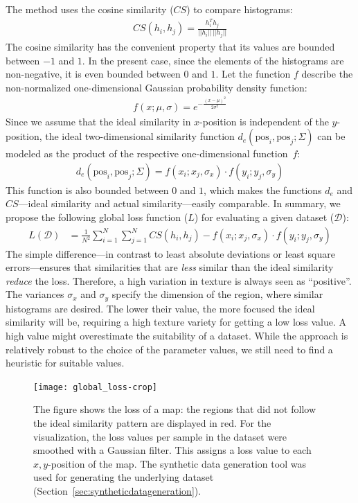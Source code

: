 \documentclass[11pt]{report}
\begin{document}
The method uses the cosine similarity ($CS$) to compare histograms:
\begin{align*}
CS(h_i, h_j) = \frac{h_i^Th_j}{||h_i||\,||h_j||}
\end{align*}
The cosine similarity has the convenient property that its values are
bounded between $-1$ and $1$. In the present case, since the elements
of the histograms are non-negative, it is even bounded between $0$ and
$1$. Let the function $f$ describe the non-normalized one-dimensional
Gaussian probability density function:
\begin{align*}
  f(x; \mu, \sigma) = e^{- \frac{(x - \mu)^2}{2 \sigma ^ 2}}  
\end{align*}
Since we assume that the ideal similarity in $x$-position is
independent of the $y$-position, the ideal two-dimensional similarity
function $d_e(\text{pos}_i, \text{pos}_j; \Sigma)$ can be modeled as
the product of the respective one-dimensional function~$f$:
\begin{align*}
d_e(\text{pos}_i, \text{pos}_j; \Sigma) = f(x_i; x_j, \sigma_x) \cdot f(y_i;
y_j, \sigma_y)
\end{align*}
This function is also bounded between $0$ and $1$, which makes the
functions $d_e$ and $CS$---ideal similarity and actual
similarity---easily comparable. In summary, we propose the following
global loss function ($L$) for evaluating a given dataset
($\mathcal{D}$):
\begin{align*}
  L(\mathcal{D}) &= \frac{1}{N^2}\sum_{i = 1}^{N} \sum_{j = 1}^{N}
                   CS(h_i, h_j) - f(x_i; x_j, \sigma_x) \cdot f(y_i; y_j, \sigma_y)                  
\end{align*}
The simple difference---in contrast to least absolute deviations or
least square errors---ensures that similarities that are \emph{less}
similar than the ideal similarity \emph{reduce} the loss. Therefore, a
high variation in texture is always seen as ``positive''. The
variances $\sigma_x$ and $\sigma_y$ specify the dimension of the
region, where similar histograms are desired. The lower their value,
the more focused the ideal similarity will be, requiring a high
texture variety for getting a low loss value. A high value might
overestimate the suitability of a dataset. While the approach is
relatively robust to the choice of the parameter values, we still need
to find a heuristic for suitable values.
\begin{figure}[h]
  \centering
  \texttt{[image: global\_loss-crop]}
  \caption{The figure shows the loss of a map: the regions that did
    not follow the ideal similarity pattern are displayed in red. For
    the visualization, the loss values per sample in the dataset were
    smoothed with a Gaussian filter. This assigns a loss value to each
    $x,y$-position of the map. The synthetic data generation tool was
    used for generating the underlying dataset
    (Section~\ref{sec:syntheticdatageneration}). }
  \label{fig:globalloss}
\end{figure}
\end{document}

